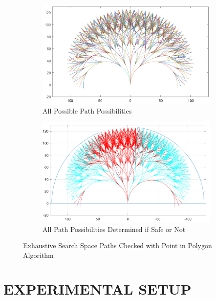 \documentclass[12pt,onecolumn]{report}
\begin{document}
\begin{figure}
	\centering
	\begin{subfigure}[t]{0.49\columnwidth}
		\centering
		\includegraphics[width=\columnwidth]{Figs/MPCPath625.png}
		\caption{{\small All Possible Path Possibilities}}   
		\label{fig:Paths}
	\end{subfigure}
	\hfill
	\begin{subfigure}[t]{0.49\columnwidth}
		\centering
		\includegraphics[width=\columnwidth]{Figs/MPCPath625_withLIDAR.png}
		\caption{\small All Path Possibilities Determined if Safe or Not}   
		\label{fig:PathsSafe}
	\end{subfigure}
	\caption{\small Exhaustive Search Space Paths Checked with Point in Polygon Algorithm}
	\label{fig:SearchPaths}
\end{figure}


\chapter{EXPERIMENTAL SETUP}\label{c:ExpSetup}
\end{document}
